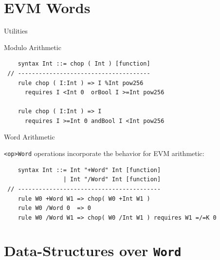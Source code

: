 \documentclass[8pt,ignorenonframetext,]{beamer}
\begin{document}
\section{EVM Words}\label{evm-words}

\begin{frame}[fragile]{Utilities}

\pause

\begin{block}{Modulo Arithmetic}

\begin{verbatim}
    syntax Int ::= chop ( Int ) [function]
 // --------------------------------------
    rule chop ( I:Int ) => I %Int pow256
      requires I <Int 0  orBool I >=Int pow256

    rule chop ( I:Int ) => I
      requires I >=Int 0 andBool I <Int pow256
\end{verbatim}

\pause

\end{block}

\begin{block}{Word Arithmetic}

\texttt{\textless{}op\textgreater{}Word} operations incorporate the
behavior for EVM arithmetic:

\begin{verbatim}
    syntax Int ::= Int "+Word" Int [function]
                 | Int "/Word" Int [function]
 // -----------------------------------------
    rule W0 +Word W1 => chop( W0 +Int W1 )
    rule W0 /Word 0  => 0
    rule W0 /Word W1 => chop( W0 /Int W1 ) requires W1 =/=K 0
\end{verbatim}

\end{block}

\end{frame}

\section{\texorpdfstring{Data-Structures over
\texttt{Word}}{Data-Structures over Word}}\label{data-structures-over-word}
\end{document}
